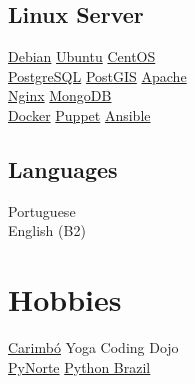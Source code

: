 \documentclass[]{joaosoares-resume}
\begin{document}
\begin{minipage}[t]{0.35\textwidth}
\subsection{Linux Server}
\href{http://www.debian.org/}{Debian}\textbullet{}
\href{http://www.ubuntu.com/}{Ubuntu}\textbullet{}
\href{http://www.centos.org/}{CentOS} \\
\href{http://www.postgresql.org/}{PostgreSQL}\textbullet{}
\href{http://www.postgis.net}{PostGIS}\textbullet{}
\href{http://httpd.apache.org/}{Apache}\\
\href{https://www.nginx.com/resources/wiki/}{Nginx}\textbullet{}
\href{https://www.mongodb.com/}{MongoDB} \\
\href{http://www.docker.com/}{Docker} \textbullet{}
\href{http://puppetlabs.com/}{Puppet} \textbullet{}
\href{https://www.ansible.com/}{Ansible} \\
\sectionsep

\subsection{Languages}
Portuguese \\
English (B2) \\
\sectionsep


\section{Hobbies}
\href{https://en.wikipedia.org/wiki/Carimbo}{Carimbó} \textbullet{} Yoga \textbullet{} Coding Dojo\\
\href{http://pynorte.python.org.br}{PyNorte} \textbullet{} \href{http://python.org.br}{Python Brazil} \\


\end{minipage}
\end{document}
